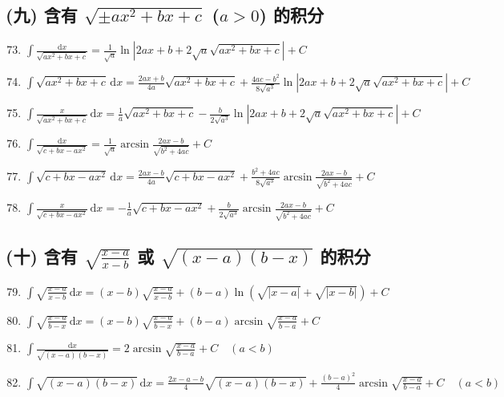 \subsection*{(九) 含有 $\sqrt{\pm ax^2 + bx + c}$ ($a > 0$) 的积分}

\begin{enumerate}
    \setcounter{enumi}{72}
    \item $\displaystyle \int \frac{\mathrm{d}x}{\sqrt{ax^2 + bx + c}} = \frac{1}{\sqrt{a}} \ln \left| 2ax + b + 2\sqrt{a} \sqrt{ax^2 + bx + c} \right| + C$
    \item $\displaystyle \int \sqrt{ax^2 + bx + c} \, \mathrm{d}x = \frac{2ax + b}{4a} \sqrt{ax^2 + bx + c} + \frac{4ac - b^2}{8\sqrt{a^3}} \ln \left| 2ax + b + 2\sqrt{a} \sqrt{ax^2 + bx + c} \right| + C$
    \item $\displaystyle \int \frac{x}{\sqrt{ax^2 + bx + c}} \, \mathrm{d}x = \frac{1}{a} \sqrt{ax^2 + bx + c} - \frac{b}{2\sqrt{a^3}} \ln \left| 2ax + b + 2\sqrt{a} \sqrt{ax^2 + bx + c} \right| + C$
    \item $\displaystyle \int \frac{\mathrm{d}x}{\sqrt{c + bx - ax^2}} = \frac{1}{\sqrt{a}} \arcsin \frac{2ax - b}{\sqrt{b^2 + 4ac}} + C$
    \item $\displaystyle \int \sqrt{c + bx - ax^2} \, \mathrm{d}x = \frac{2ax - b}{4a} \sqrt{c + bx - ax^2} + \frac{b^2 + 4ac}{8\sqrt{a^3}} \arcsin \frac{2ax - b}{\sqrt{b^2 + 4ac}} + C$
    \item $\displaystyle \int \frac{x}{\sqrt{c + bx - ax^2}} \, \mathrm{d}x = -\frac{1}{a} \sqrt{c + bx - ax^2} + \frac{b}{2\sqrt{a^3}} \arcsin \frac{2ax - b}{\sqrt{b^2 + 4ac}} + C$
\end{enumerate}

\subsection*{(十) 含有 $\sqrt{\frac{x - a}{x - b}}$ 或 $\sqrt{(x - a)(b - x)}$ 的积分}

\begin{enumerate}
    \setcounter{enumi}{78}
    \item $\displaystyle \int \sqrt{\frac{x - a}{x - b}} \, \mathrm{d}x = (x - b) \sqrt{\frac{x - a}{x - b}} + (b - a) \ln \left( \sqrt{|x - a|} + \sqrt{|x - b|} \right) + C$
    \item $\displaystyle \int \sqrt{\frac{x - a}{b - x}} \, \mathrm{d}x = (x - b) \sqrt{\frac{x - a}{b - x}} + (b - a) \arcsin \sqrt{\frac{x - a}{b - a}} + C$
    \item $\displaystyle \int \frac{\mathrm{d}x}{\sqrt{(x - a)(b - x)}} = 2 \arcsin \sqrt{\frac{x - a}{b - a}} + C \quad (a < b)$
    \item $\displaystyle \int \sqrt{(x - a)(b - x)} \, \mathrm{d}x = \frac{2x - a - b}{4} \sqrt{(x - a)(b - x)} + \frac{(b - a)^2}{4} \arcsin \sqrt{\frac{x - a}{b - a}} + C \quad (a < b)$
\end{enumerate}

